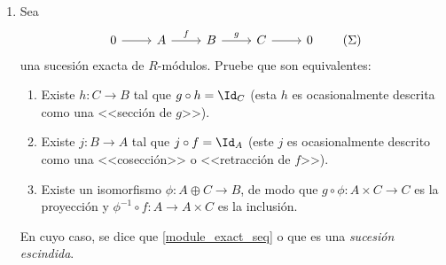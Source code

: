 \documentclass[11pt, reqno]{amsart}
\begin{document}
\begin{enumerate}[resume]
	\item Sea
		\begin{equation}
			\begin{tikzcd}
				0 \rar & A \rar["f"] & B \rar["g"] & C \rar & 0
			\end{tikzcd}
			\tag{$\Sigma$}
			\label{module_exact_seq}
		\end{equation}
		una sucesión exacta de $R$-módulos.
		Pruebe que son equivalentes:
		\begin{enumerate}
			\item Existe $h \colon C \to B$ tal que $g\circ h = \Id_{C}$
				(esta $h$ es ocasionalmente descrita como una <<sección de $g$>>).
			\item Existe $j \colon B \to A$ tal que $j\circ f = \Id_{A}$
				(este $j$ es ocasionalmente descrito como una <<cosección>> o <<retracción de $f$>>).
			\item Existe un isomorfismo $\phi\colon A\oplus C \to B$, de modo que $g\circ\phi \colon
				A\times C \to C$ es la proyección y $\phi^{-1}\circ f \colon A \to A\times
				C$ es la inclusión. 
		\end{enumerate}
		En cuyo caso, se dice que \eqref{module_exact_seq}  o que es una \emph{sucesión
		escindida}.
\end{enumerate}


\end{document}

